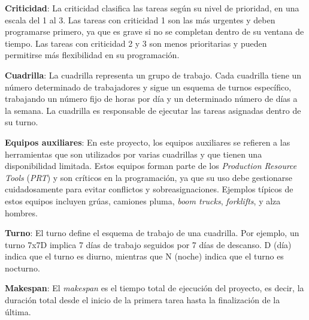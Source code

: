 \documentclass{article}
\begin{document}

\textbf{Criticidad}: La criticidad clasifica las tareas según su nivel de prioridad, en una escala del 1 al 3. Las tareas con criticidad 1 son las más urgentes y deben programarse primero, ya que es grave si no se completan dentro de su ventana de tiempo. Las tareas con criticidad 2 y 3 son menos prioritarias y pueden permitirse más flexibilidad en su programación.


\textbf{Cuadrilla}: La cuadrilla representa un grupo de trabajo. Cada cuadrilla tiene un número determinado de trabajadores y sigue un esquema de turnos específico, trabajando un número fijo de horas por día y un determinado número de días a la semana. La cuadrilla es responsable de ejecutar las tareas asignadas dentro de su turno.

\textbf{Equipos auxiliares}: En este proyecto, los equipos auxiliares se refieren a las herramientas que son utilizados por varias cuadrillas y que tienen una disponibilidad limitada. Estos equipos forman parte de los \textit{Production Resource Tools} (\textit{PRT}) y son críticos en la programación, ya que su uso debe gestionarse cuidadosamente para evitar conflictos y sobreasignaciones. Ejemplos típicos de estos equipos incluyen grúas, camiones pluma, \textit{boom trucks}, \textit{forklifts}, y alza hombres.

\textbf{Turno}: El turno define el esquema de trabajo de una cuadrilla. Por ejemplo, un turno 7x7D implica 7 días de trabajo seguidos por 7 días de descanso. D (día) indica que el turno es diurno, mientras que N (noche) indica que el turno es nocturno.

\textbf{Makespan}: El \textit{makespan} es el tiempo total de ejecución del proyecto, es decir, la duración total desde el inicio de la primera tarea hasta la finalización de la última.


\end{document}
